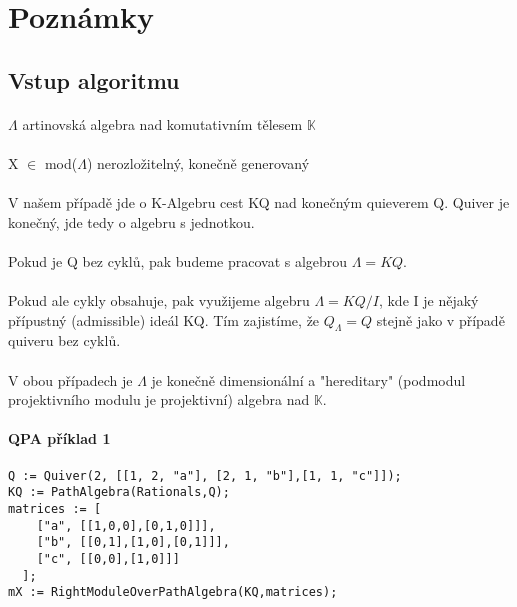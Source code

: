 \documentclass[7pt]{article}
\begin{document}
  \section{Poznámky}
  
    \subsection{Vstup algoritmu}
      \paragraph{}$\Lambda$ artinovská algebra nad komutativním tělesem $\mathbb{K}$
      \paragraph{}X $\in$ mod($\Lambda$) nerozložitelný, konečně generovaný
      \paragraph{} V našem případě jde o K-Algebru cest KQ nad konečným quieverem Q. 
      Quiver je konečný, jde tedy o algebru s jednotkou. 
      \paragraph{} Pokud je Q bez cyklů, pak budeme pracovat s algebrou $\Lambda=KQ$.
       \paragraph{} Pokud ale cykly obsahuje, pak využijeme algebru $\Lambda=KQ/I$, 
       kde I je nějaký přípustný (admissible) ideál KQ. Tím zajistíme, že $Q_\Lambda=Q$ 
       stejně jako v případě quiveru bez cyklů.
       \paragraph{} V obou případech je $\Lambda$ je konečně dimensionální 
       a "hereditary" (podmodul projektivního modulu je projektivní) algebra nad $\mathbb{K}$. 
      \paragraph{QPA příklad 1}
\begin{verbatim}
Q := Quiver(2, [[1, 2, "a"], [2, 1, "b"],[1, 1, "c"]]); 
KQ := PathAlgebra(Rationals,Q);    
matrices := [ 
    ["a", [[1,0,0],[0,1,0]]], 
    ["b", [[0,1],[1,0],[0,1]]], 
    ["c", [[0,0],[1,0]]] 
  ]; 
mX := RightModuleOverPathAlgebra(KQ,matrices);
 \end{verbatim}
\end{document}
